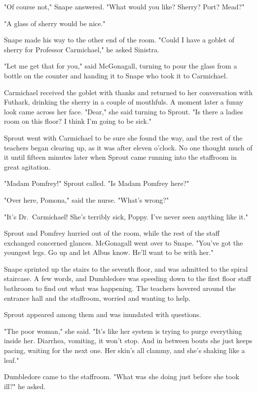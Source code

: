 "Of course not," Snape answered. "What would you like? Sherry? Port? Mead?"

"A glass of sherry would be nice."

Snape made his way to the other end of the room. "Could I have a goblet of sherry for Professor Carmichael," he asked Sinistra.

"Let me get that for you," said McGonagall, turning to pour the glass from a bottle on the counter and handing it to Snape who took it to Carmichael.

Carmichael received the goblet with thanks and returned to her conversation with Futhark, drinking the sherry in a couple of mouthfuls. A moment later a funny look came across her face. "Dear," she said turning to Sprout. "Is there a ladies room on this floor? I think I'm going to be sick."

Sprout went with Carmichael to be sure she found the way, and the rest of the teachers began clearing up, as it was after eleven o'clock. No one thought much of it until fifteen minutes later when Sprout came running into the staffroom in great agitation.

"Madam Pomfrey!" Sprout called. "Is Madam Pomfrey here?"

"Over here, Pomona," said the nurse. "What's wrong?"

"It's Dr.~Carmichael! She's terribly sick, Poppy. I've never seen anything like it."

Sprout and Pomfrey hurried out of the room, while the rest of the staff exchanged concerned glances. McGonagall went over to Snape. "You've got the youngest legs. Go up and let Albus know. He'll want to be with her."

Snape sprinted up the stairs to the seventh floor, and was admitted to the spiral staircase. A few words, and Dumbledore was speeding down to the first floor staff bathroom to find out what was happening. The teachers hovered around the entrance hall and the staffroom, worried and wanting to help.

Sprout appeared among them and was inundated with questions.

"The poor woman," she said. "It's like her system is trying to purge everything inside her. Diarrhea, vomiting, it won't stop. And in between bouts she just keeps pacing, waiting for the next one. Her skin's all clammy, and she's shaking like a leaf."

Dumbledore came to the staffroom. "What was she doing just before she took ill?" he asked.

